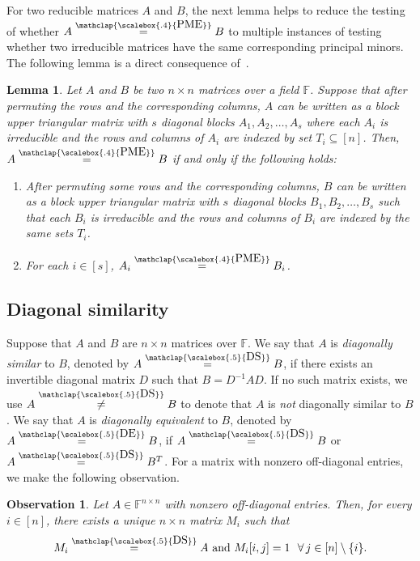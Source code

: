 \documentclass[11pt,letterpaper]{article}
\newcommand{\F}{\mathbb{F}}
\newtheorem{lemma}{Lemma}[section]
\newtheorem{observation}{Observation}[section]
\newcommand{\DS}{\stackrel{\mathclap{\scalebox{.5}{\mbox{DS}}}}{=}}
\newcommand{\nDS}{\stackrel{\mathclap{\scalebox{.5}{\mbox{DS}}}}{\neq}}
\newcommand{\DE}{\stackrel{\mathclap{\scalebox{.5}{\mbox{DE}}}}{=}}
\newcommand{\PME}{\stackrel{\mathclap{\scalebox{.4}{\mbox{PME}}}}{=}}
\newcommand{\nsubset}[1]{[n]\setminus\{#1\}}
\begin{document}
{{{%
For two reducible matrices $A$ and $B$, the next lemma helps to reduce the testing of whether $A\PME B$ to multiple instances of testing whether two irreducible matrices have the same corresponding principal minors. The following lemma is a direct consequence of~\cite[Corollary~5.4]{Ahmadieh23}.
\begin{lemma}
\label{lem:redToIr}
Let $A$ and $B$ be two $n\times n$ matrices over a field $\F$. Suppose that after permuting the rows and the corresponding columns, $A$ can be written as a block upper triangular matrix with $s$ diagonal blocks $A_1,A_2,\dots,A_s$ where each $A_i$ is irreducible and the rows and columns of $A_i$ are indexed by set $T_i\subseteq [n]$. Then, $A\PME B$ if and only if the following holds:
\begin{enumerate}
    \item After permuting some rows and the corresponding columns, $B$ can be written as a block upper triangular matrix with $s$ diagonal blocks $B_1,B_2,\dots,B_s$ such that each $B_i$ is irreducible and the rows and columns of $B_i$ are indexed by the same sets $T_i$.
    \item For each $i\in [s]$, $A_i\PME B_i$.
\end{enumerate}
\end{lemma}


\subsection{Diagonal similarity}
\label{sec:diagonal-similarity}
Suppose that $A$ and $B$ are $n\times n$ matrices over $\F$. We say that $A$ is \emph{diagonally similar} to $B$, denoted by $A\DS B$, if there exists an invertible diagonal matrix $D$ such that $B=D^{-1}AD$. If no such matrix exists, we use $A\nDS B$ to denote that $A$ is \emph{not} diagonally similar to $B$.  We say that $A$ is \emph{diagonally equivalent} to $B$, denoted by $A\DE B$, if $A\DS B$ or $A\DS B^T$. For a matrix with nonzero off-diagonal entries, we make the following observation.
\begin{observation}
\label{obs:uniqueness-of-DS}
Let $A\in\F^{n\times n}$  with nonzero off-diagonal entries. Then, for every $i\in[n]$, there exists a unique $n\times n$ matrix $M_i$ such that $$M_i\DS A \text{ and } M_i[i, j]=1\ \ \forall\, j\in \nsubset{i}.$$ 
\end{observation}

}}}
\end{document}

